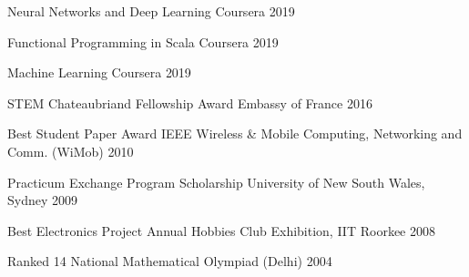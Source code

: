 


\begin{cvhonors}

  \cvhonor
    {Neural Networks and Deep Learning} %
    {Coursera} %
    {} %
    {2019} %
    
  \cvhonor
    {Functional Programming in Scala} %
    {Coursera} %
    {} %
    {2019} %
    
  \cvhonor
    {Machine Learning} %
    {Coursera} %
    {} %
    {2019} %


  \cvhonor
    {STEM Chateaubriand Fellowship Award} %
    {Embassy of France} %
    {} %
    {2016} %

%
  \cvhonor
    {Best Student Paper Award} %
    {IEEE Wireless \& Mobile Computing, Networking and Comm. (WiMob)} %
    {} %
    {2010} %

  \cvhonor
    {Practicum Exchange Program Scholarship} %
    {University of New South Wales, Sydney} %
    {} %
    {2009} %

  \cvhonor
    {Best Electronics Project} %
    {Annual Hobbies Club Exhibition, IIT Roorkee} %
    {} %
    {2008} %
    
  \cvhonor
    {Ranked 14} %
    {National Mathematical Olympiad (Delhi)} %
    {} %
    {2004} %

\end{cvhonors}


